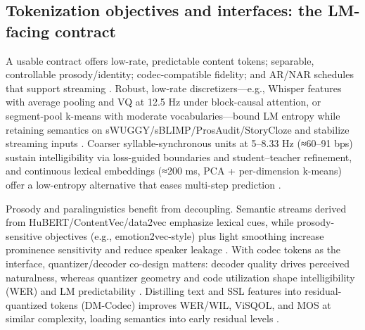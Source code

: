 \documentclass{article}
\begin{document}
\subsection{Tokenization objectives and interfaces: the LM-facing contract} \label{subsec:Tokenization objectives and interfaces: the LM-facing contract}
A usable contract offers low-rate, predictable content tokens; separable, controllable prosody/identity; codec-compatible fidelity; and AR/NAR schedules that support streaming \cite{guo2025recentadvancesdiscretespeechtokensreview}. Robust, low-rate discretizers—e.g., Whisper features with average pooling and VQ at 12.5 Hz under block-causal attention, or segment-pool k-means with moderate vocabularies—bound LM entropy while retaining semantics on sWUGGY/sBLIMP/ProsAudit/StoryCloze and stabilize streaming inputs \cite{zeng2024scalingspeechtextpretrainingsyntheticint,kando2025exploringeffectsegmentationvocabularysiz}. Coarser syllable-synchronous units at 5–8.33 Hz (≈60–91 bps) sustain intelligibility via loss-guided boundaries and student–teacher refinement, and continuous lexical embeddings (≈200 ms, PCA + per-dimension k-means) offer a low-entropy alternative that eases multi-step prediction \cite{baade2024syllablelmlearningcoarsesemanticunitsspe,algayres2023generativespokenlanguagemodelbasedcontin}.

Prosody and paralinguistics benefit from decoupling. Semantic streams derived from HuBERT/ContentVec/data2vec emphasize lexical cues, while prosody-sensitive objectives (e.g., emotion2vec-style) plus light smoothing increase prominence sensitivity and reduce speaker leakage \cite{onda2025benchmarkingprosodyencodingdiscretespeec}. With codec tokens as the interface, quantizer/decoder co-design matters: decoder quality drives perceived naturalness, whereas quantizer geometry and code utilization shape intelligibility (WER) and LM predictability \cite{li2024investigatingneuralaudiocodecsspeechlang}. Distilling text and SSL features into residual-quantized tokens (DM-Codec) improves WER/WIL, ViSQOL, and MOS at similar complexity, loading semantics into early residual levels \cite{ahasan2025dmcodecdistillingmultimodalrepresentatio}.
\end{document}
